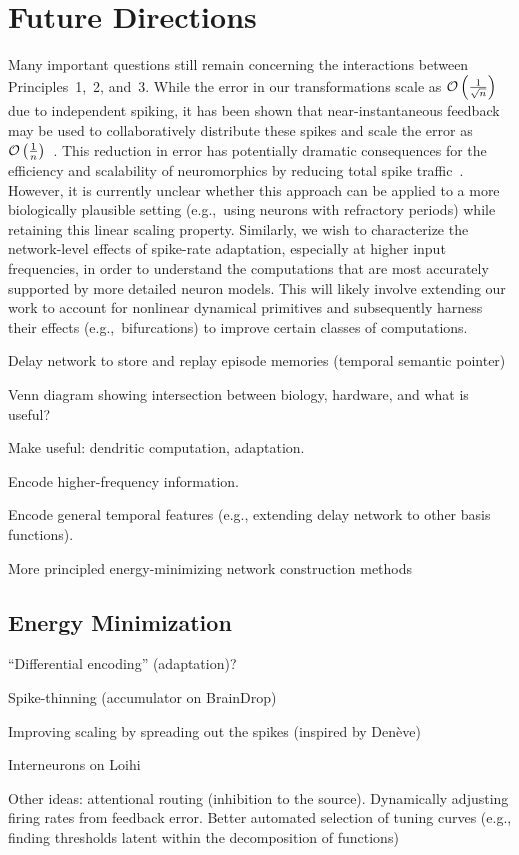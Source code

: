 \section{Future Directions}

Many important questions still remain concerning the interactions between Principles~1,~2, and~3.
While the error in our transformations scale as $\mathcal{O}\left({ \frac{1}{\sqrt{n}} }\right)$ due to independent spiking, it has been shown that near-instantaneous feedback may be used to collaboratively distribute these spikes and scale the error as $\mathcal{O}\left({ \frac{1}{n} }\right)$~\citep{boerlin2013predictive, thalmeier2016learning}.
This reduction in error has potentially dramatic consequences for the efficiency and scalability of neuromorphics by reducing total spike traffic~\citep{boahen2017neuromorph}.
However, it is currently unclear whether this approach can be applied to a more biologically plausible setting (e.g.,~using neurons with refractory periods) while retaining this linear scaling property.
Similarly, we wish to characterize the network-level effects of spike-rate adaptation, especially at higher input frequencies, in order to understand the computations that are most accurately supported by more detailed neuron models.
This will likely involve extending our work to account for nonlinear dynamical primitives and subsequently harness their effects (e.g.,~bifurcations) to improve certain classes of computations.

Delay network to store and replay episode memories (temporal semantic pointer)

Venn diagram showing intersection between biology, hardware, and what is useful?

Make useful: dendritic computation, adaptation.

Encode higher-frequency information.

Encode general temporal features (e.g., extending delay network to other basis functions).

More principled energy-minimizing network construction methods

\subsection{Energy Minimization}

``Differential encoding'' (adaptation)?

Spike-thinning (accumulator on BrainDrop)

Improving scaling by spreading out the spikes (inspired by Den\`eve)

Interneurons on Loihi

Other ideas: attentional routing (inhibition to the source). Dynamically adjusting firing rates from feedback error. Better automated selection of tuning curves (e.g., finding thresholds latent within the decomposition of functions)

